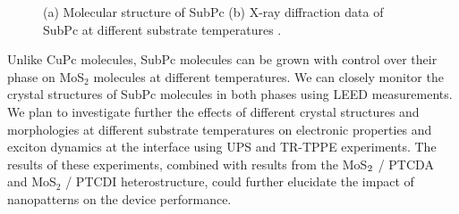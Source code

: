 \documentclass[12pt]{article}
\begin{document}
\begin{figure}[H]
\centering
{}\hspace{10pt}
\caption{(a) Molecular structure of SubPc (b) X-ray diffraction data of SubPc at different substrate temperatures \cite{chou2012effect}.}\label{fig:SubPC temp}
\end{figure}
Unlike CuPc molecules, SubPc molecules can be grown with control over their phase on MoS$_2$ molecules at different temperatures. We can closely monitor the crystal structures of SubPc molecules in both phases using LEED measurements. We plan to investigate further the  effects of different crystal structures and morphologies at different substrate temperatures on electronic properties and exciton dynamics at the interface using UPS and TR-TPPE experiments. The results of these experiments, combined with results from the MoS$\protect_2$ / PTCDA and MoS$_2$ / PTCDI heterostructure, could further elucidate the impact of nanopatterns on the device performance.
\end{document}
